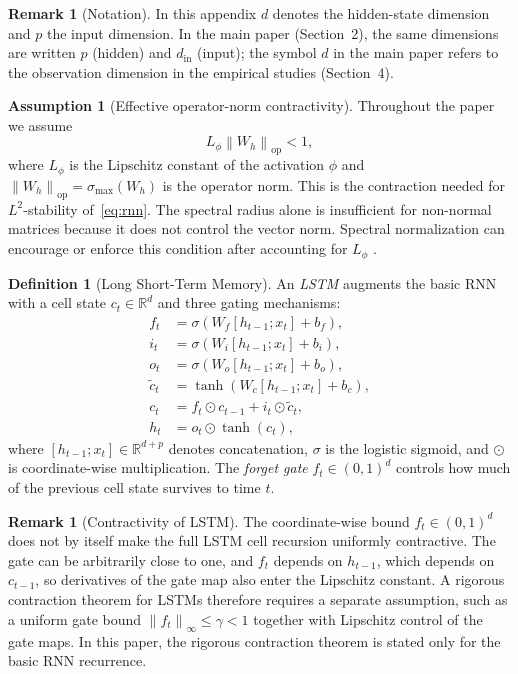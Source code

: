 \documentclass[bj,authoryear]{imsart}
\theoremstyle{plain}
\theoremstyle{definition}
\newtheorem{definition}[theorem]{Definition}
\newtheorem{remark}[theorem]{Remark}
\newtheorem{assumption}[theorem]{Assumption}
\newcommand{\R}{\mathbb{R}}
\newcommand{\norm}[1]{\left\lVert #1 \right\rVert}
\begin{document}
\begin{remark}[Notation]
  In this appendix $d$ denotes the hidden-state dimension and $p$ the input dimension.
  In the main paper (Section~2), the same dimensions are written $p$ (hidden) and $d_{\mathrm{in}}$ (input); the symbol $d$ in the main paper refers to the observation dimension in the empirical studies (Section~4).
\end{remark}

\begin{assumption}[Effective operator-norm contractivity]
\label{ass:spectral}
  Throughout the paper we assume
  \[
    L_\phi\norm{W_h}_{\mathrm{op}}<1,
  \]
  where $L_\phi$ is the Lipschitz constant of the activation $\phi$ and
  $\norm{W_h}_{\mathrm{op}}=\sigma_{\max}(W_h)$ is the operator norm.  This is
  the contraction needed for $L^2$-stability of~\eqref{eq:rnn}.  The spectral
  radius alone is insufficient for non-normal matrices because it does not
  control the vector norm.  Spectral normalization can encourage or enforce this
  condition after accounting for $L_\phi$ \citep{miyato2018spectral}.
\end{assumption}

\begin{definition}[Long Short-Term Memory]
\label{def:lstm}
  An \emph{LSTM} \citep{hochreiter1997long} augments the basic RNN with a cell
  state $c_t \in \R^d$ and three gating mechanisms:
  \begin{align}
    f_t &= \sigma(W_f [h_{t-1}; x_t] + b_f), \label{eq:forget}\\
    i_t &= \sigma(W_i [h_{t-1}; x_t] + b_i), \label{eq:input}\\
    o_t &= \sigma(W_o [h_{t-1}; x_t] + b_o), \label{eq:output-gate}\\
    \tilde{c}_t &= \tanh(W_c [h_{t-1}; x_t] + b_c), \label{eq:candidate}\\
    c_t &= f_t \odot c_{t-1} + i_t \odot \tilde{c}_t, \label{eq:cell}\\
    h_t &= o_t \odot \tanh(c_t), \label{eq:hidden}
  \end{align}
  where $[h_{t-1};x_t]\in\R^{d+p}$ denotes concatenation, $\sigma$ is the
  logistic sigmoid, and $\odot$ is coordinate-wise multiplication.
  The \emph{forget gate} $f_t \in (0,1)^d$ controls how much of the previous
  cell state survives to time $t$.
\end{definition}

\begin{remark}[Contractivity of LSTM]
  The coordinate-wise bound $f_t\in(0,1)^d$ does not by itself make the full
  LSTM cell recursion uniformly contractive.  The gate can be arbitrarily close
  to one, and $f_t$ depends on $h_{t-1}$, which depends on $c_{t-1}$, so
  derivatives of the gate map also enter the Lipschitz constant.  A rigorous
  contraction theorem for LSTMs therefore requires a separate assumption, such
  as a uniform gate bound $\norm{f_t}_\infty\leq\gamma<1$ together with Lipschitz
  control of the gate maps.  In this paper, the rigorous contraction theorem is
  stated only for the basic RNN recurrence.
\end{remark}
\end{document}
